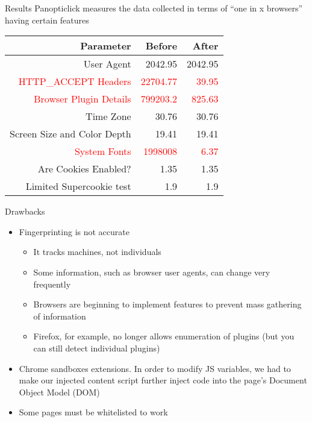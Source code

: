 \begin{frame}[fragile,t]{Results}
	Panopticlick measures the data collected in terms of ``one in x browsers'' having certain features
	
	\begin{table}[h]
	\centering
	\begin{tabular}{>{\scriptsize}r|>{\scriptsize}r|>{\scriptsize}r}
		\textbf{Parameter} & \textbf{Before} & \textbf{After} \\
		\hline
		User Agent & 2042.95 & 2042.95 \\
		\textcolor{red}{HTTP\_ACCEPT Headers} & \textcolor{red}{22704.77} & \textcolor{red}{39.95} \\
		\textcolor{red}{Browser Plugin Details} & \textcolor{red}{799203.2} & \textcolor{red}{825.63} \\
		Time Zone & 30.76 & 30.76 \\
		Screen Size and Color Depth & 19.41 & 19.41 \\
		\textcolor{red}{System Fonts} & \textcolor{red}{1998008} & \textcolor{red}{6.37} \\
		Are Cookies Enabled? & 1.35 & 1.35 \\
		Limited Supercookie test & 1.9 & 1.9
	\end{tabular}
	\end{table}
\end{frame}

\begin{frame}[fragile,t]{Drawbacks}
	\begin{itemize}
		\item Fingerprinting is not accurate
		\begin{itemize}
			\item It tracks machines, not individuals
			\item Some information, such as browser user agents, can change very frequently
			\item Browsers are beginning to implement features to prevent mass gathering of information
			\item Firefox, for example, no longer allows enumeration of plugins (but you can still detect individual plugins)
		\end{itemize}
		\item Chrome sandboxes extensions. In order to modify JS variables, we had to make our injected content script further inject code into the page's Document Object Model (DOM)
		\item Some pages must be whitelisted to work
	\end{itemize}
\end{frame}

